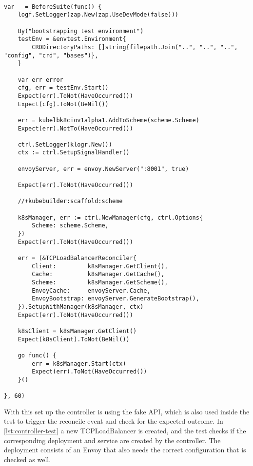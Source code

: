 \begin{lstlisting}[caption={TCPLoadBalancer controller integration test}, label={lst:controller-test-setup}]

var _ = BeforeSuite(func() {
    logf.SetLogger(zap.New(zap.UseDevMode(false)))

    By("bootstrapping test environment")
    testEnv = &envtest.Environment{
        CRDDirectoryPaths: []string{filepath.Join("..", "..", "..", "config", "crd", "bases")},
    }

    var err error
    cfg, err = testEnv.Start()
    Expect(err).ToNot(HaveOccurred())
    Expect(cfg).ToNot(BeNil())

    err = kubelbk8ciov1alpha1.AddToScheme(scheme.Scheme)
    Expect(err).NotTo(HaveOccurred())

    ctrl.SetLogger(klogr.New())
    ctx := ctrl.SetupSignalHandler()

    envoyServer, err = envoy.NewServer(":8001", true)

    Expect(err).ToNot(HaveOccurred())

    //+kubebuilder:scaffold:scheme

    k8sManager, err := ctrl.NewManager(cfg, ctrl.Options{
        Scheme: scheme.Scheme,
    })
    Expect(err).ToNot(HaveOccurred())

    err = (&TCPLoadBalancerReconciler{
        Client:         k8sManager.GetClient(),
        Cache:          k8sManager.GetCache(),
        Scheme:         k8sManager.GetScheme(),
        EnvoyCache:     envoyServer.Cache,
        EnvoyBootstrap: envoyServer.GenerateBootstrap(),
    }).SetupWithManager(k8sManager, ctx)
    Expect(err).ToNot(HaveOccurred())

    k8sClient = k8sManager.GetClient()
    Expect(k8sClient).ToNot(BeNil())

    go func() {
        err = k8sManager.Start(ctx)
        Expect(err).ToNot(HaveOccurred())
    }()

}, 60)
\end{lstlisting}

With this set up the controller is using the fake API, which is also used inside the test to trigger the reconcile event and check for the expected outcome.
In \autoref{lst:controller-test} a new TCPLoadBalancer is created, and the test checks if the corresponding deployment and service are created by the controller.
The deployment consists of an Envoy that also needs the correct configuration that is checked as well.

